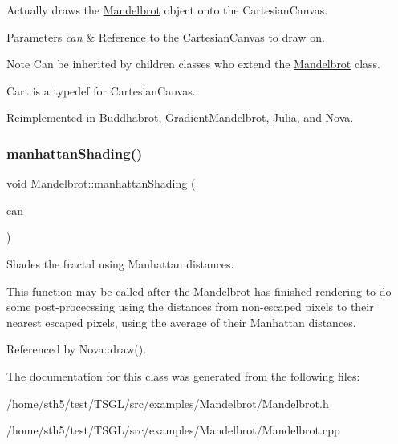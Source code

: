 Actually draws the \hyperlink{class_mandelbrot}{Mandelbrot} object onto the Cartesian\+Canvas. 
\begin{DoxyParams}{Parameters}
{\em can} & Reference to the Cartesian\+Canvas to draw on. \\
\hline
\end{DoxyParams}
\begin{DoxyNote}{Note}
Can be inherited by children classes who extend the \hyperlink{class_mandelbrot}{Mandelbrot} class. 

Cart is a typedef for Cartesian\+Canvas. 
\end{DoxyNote}


Reimplemented in \hyperlink{class_buddhabrot_a9e65eb7e2cac8737aedec56a7e2c274c}{Buddhabrot}, \hyperlink{class_gradient_mandelbrot_a1d4aa3e44d7d1c2241545b60c79985df}{Gradient\+Mandelbrot}, \hyperlink{class_julia_ab877233424159ca87da6dcf0f0f36e51}{Julia}, and \hyperlink{class_nova_a66935ba0814dfabcae2481c128c336ec}{Nova}.

\mbox{\label{class_mandelbrot_aef094f9bb9b2fd1107481b150205ff53}} 
\subsubsection{\texorpdfstring{manhattan\+Shading()}{manhattanShading()}}
{\footnotesize\ttfamily void Mandelbrot\+::manhattan\+Shading (\begin{DoxyParamCaption}\item[{\hyperlink{classtsgl_1_1_cartesian_canvas}{Cartesian\+Canvas} \&}]{can }\end{DoxyParamCaption})\hspace{0.3cm}{\ttfamily [protected]}}



Shades the fractal using Manhattan distances. 

This function may be called after the \hyperlink{class_mandelbrot}{Mandelbrot} has finished rendering to do some post-\/procecssing using the distances from non-\/escaped pixels to their nearest escaped pixels, using the average of their Manhattan distances. 

Referenced by Nova\+::draw().



The documentation for this class was generated from the following files\+:\begin{DoxyCompactItemize}
\item 
/home/sth5/test/\+T\+S\+G\+L/src/examples/\+Mandelbrot/Mandelbrot.\+h\item 
/home/sth5/test/\+T\+S\+G\+L/src/examples/\+Mandelbrot/Mandelbrot.\+cpp\end{DoxyCompactItemize}
